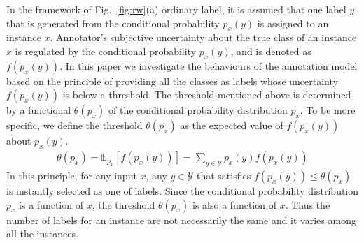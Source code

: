 \documentclass[a4paper,conference]{IEEEtran}
\begin{document}
In the framework of Fig.~\ref{fig:rw}(a) ordinary label, it is assumed that one label $y$ that is generated from the conditional probability $p_{x}(y)$ is assigned to an instance $x$.
Annotator's subjective uncertainty about the true class of an instance $x$ is regulated by the conditional probability $p_{x}(y)$, and is denoted as $f(p_{x}(y))$.
In this paper we investigate the behaviours of the annotation model based on the principle of providing all the classes as labels whose uncertainty $f(p_{x}(y))$ is below a threshold.
The threshold mentioned above is determined by a functional $\theta(p_{x})$ of the conditional probability distribution $p_{x}$.
To be more specific, we define the threshold $\theta(p_{x})$ as the expected value of $f(p_{x}(y))$ about $p_{x}(y)$. 
\begin{align}
    \theta(p_{x})
    = \mathbb{E}_{p_{x}}[f(p_{x}(y))]
    = \sum_{y \in \mathcal{Y}}p_{x}(y)f(p_{x}(y))
\end{align}
In this principle, for any input $x$, any $y \in \mathcal{Y}$ that satisfies $f(p_{x}(y)) \le \theta(p_{x})$ is instantly selected as one of labels.
Since the conditional probability distribution $p_{x}$ is a function of $x$, the threshold $\theta(p_{x})$ is also a function of $x$.
Thus the number of labels for an instance are not necessarily the same and it varies among all the instances.
\end{document}
